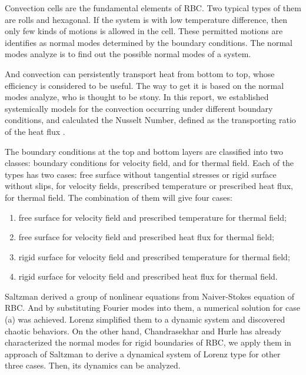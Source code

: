 Convection cells are the fundamental elements of RBC. Two typical types of them are rolls and hexagonal. If the system
is with low temperature difference, then only few kinds of motions is allowed in the cell. These permitted motions are
identifies as normal modes determined by the boundary conditions. The normal modes analyze is to find out the possible normal modes of a system.\par
And convection can persistently transport heat from bottom to top, whose efficiency is considered to be useful. The way
to get it is based on the normal modes analyze, who is thought to be stony. In this report, we established systemically models for the convection occurring under different boundary conditions, and calculated the Nusselt Number, defined as the transporting ratio of the heat flux .\par 
The boundary conditions at the top and bottom layers are classified into two classes: boundary conditions for velocity field, and for thermal field. Each of the types has two cases: free surface without tangential stresses or rigid surface without slips, for velocity fields, prescribed temperature or prescribed heat flux, for thermal field. The combination of them will give four cases:
\begin{center}
\parbox[c]{0.9\linewidth}{
\begin{enumerate}
	\item free surface for velocity field and prescribed temperature for thermal field;
	\item free surface for velocity field and prescribed heat flux for thermal field;
	\item rigid surface for velocity field and prescribed temperature for thermal field;
	\item rigid surface for velocity field and prescribed heat flux for thermal field.
\end{enumerate}
}
\end{center}\par
Saltzman derived a group of nonlinear equations from Naiver-Stokes equation of RBC. And by substituting Fourier modes
into them, a numerical solution for case (a) was achieved. Lorenz simplified them to a dynamic system and discovered
chaotic behaviors. On the other hand, Chandrasekhar and Hurle has already characterized the normal modes for rigid boundaries of RBC, we apply them in approach of Saltzman to derive a dynamical system of Lorenz type for other three cases. Then, its dynamics can be analyzed.\par
